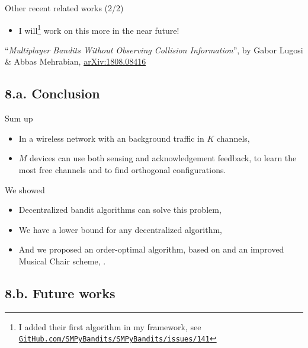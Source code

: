 \documentclass[12pt,english,ignorenonframetext,]{beamer}
\providecommand{\tightlist}{%
  \setlength{\itemsep}{0pt}\setlength{\parskip}{0pt}}
\begin{document}
\begin{frame}{Other recent related works (2/2)}
\begin{itemize}
\item
I will\footnote{\tiny I added their first algorithm in my framework, see \href{https://github.com/SMPyBandits/SMPyBandits/issues/141}{\texttt{GitHub.com/SMPyBandits/SMPyBandits/issues/141}}}
work on this more in the near future!

\end{itemize}

\vfill{}
\begin{footnotesize}
  ``\emph{Multiplayer Bandits Without Observing Collision Information}'',
  by Gabor Lugosi \& Abbas Mehrabian,
  \textcolor{blue}{\href{https://arxiv.org/abs/1808.08416}{arXiv:1808.08416}}
\end{footnotesize}

\end{frame}


\subsection{\hfill{}8.a. Conclusion\hfill{}}

\begin{frame}{Sum up}

\begin{itemize}\tightlist
\item
  In a wireless network with an \iid{} background traffic in \(K\)
  channels,
\item
  \(M\) devices can use both sensing and acknowledgement feedback, to
  learn the most free channels and to find orthogonal configurations.
\end{itemize}

\begin{block}{We showed}

\begin{itemize}\tightlist
\item
  Decentralized bandit algorithms can solve this problem,
\item
  We have a lower bound for any decentralized algorithm,
\item
  And we proposed an order-optimal algorithm, based on \klUCB{} and an
  improved Musical Chair scheme, \MCTopM.
\end{itemize}

\end{block}

\end{frame}



\subsection{\hfill{}8.b. Future works\hfill{}}
\end{document}
